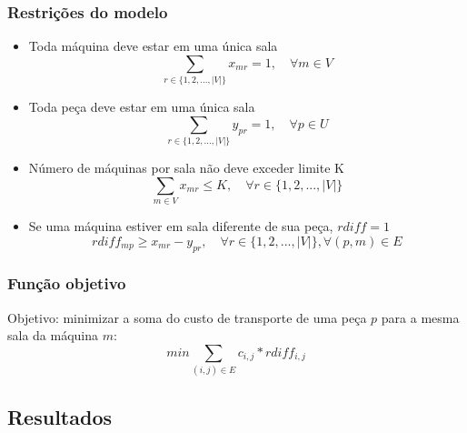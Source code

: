 \documentclass[11pt,letterpaper]{article}
\begin{document}
\subsubsection*{Restrições do modelo}
\begin{itemize}
\item Toda máquina deve estar em uma única sala
\begin{equation*}
  \sum_{r \in  \{1,2,...,|V|\}}x_{mr}=1,\quad \forall m \in V
\end{equation*}

\item Toda peça deve estar em uma única sala
\begin{equation*}
  \sum_{r \in  \{1,2,...,|V|\}}y_{pr}=1, \quad\forall p \in U
\end{equation*}

\item Número de máquinas por sala não deve exceder limite K
\begin{equation*}
  \sum_{m \in V }x_{mr}\leq K,\quad \forall r \in \{1,2,...,|V|\}
\end{equation*}

\item Se uma máquina estiver em sala diferente de sua peça, $rdiff=1$
\begin{equation*}
  rdiff_{mp}\geq x_{mr}-y_{pr},\quad \forall r \in \{1,2,...,|V|\}, \forall (p,m) \in E
\end{equation*}

\end{itemize}

\subsubsection*{Função objetivo}
Objetivo: minimizar a soma do custo de transporte de uma peça $p$ para
a mesma sala da máquina $m$:
\begin{equation}
min\sum_{(i,j) \in E}c_{i,j}*rdiff_{i,j}
\end{equation}



\subsection{Resultados}


\addtocounter{footnote}{1}
\end{document}

